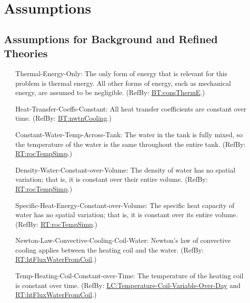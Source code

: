 \documentclass[12pt]{article}
\begin{document}

\section{Assumptions} \label{Sec:Assumps}

\subsection{Assumptions for Background and Refined Theories}

\begin{itemize}
\item[Thermal-Energy-Only:\phantomsection\label{assumpTEO}]{The only form of energy that is relevant for this problem is thermal energy. All other forms of energy, such as mechanical energy, are assumed to be negligible. (RefBy: \hyperref[BT:consThermE]{BT:consThermE}.)}
\item[Heat-Transfer-Coeffs-Constant:\phantomsection\label{assumpHTCC}]{All heat transfer coefficients are constant over time. (RefBy: \hyperref[BT:nwtnCooling]{BT:nwtnCooling}.)}
\item[Constant-Water-Temp-Across-Tank:\phantomsection\label{assumpCWTAT}]{The water in the tank is fully mixed, so the temperature of the water is the same throughout the entire tank. (RefBy: \hyperref[RT:rocTempSimp]{RT:rocTempSimp}.)}
\item[Density-Water-Constant-over-Volume:\phantomsection\label{assumpDWCoW}]{The density of water has no spatial variation; that is, it is constant over their entire volume. (RefBy: \hyperref[RT:rocTempSimp]{RT:rocTempSimp}.)}
\item[Specific-Heat-Energy-Constant-over-Volume:\phantomsection\label{assumpSHECoW}]{The specific heat capacity of water has no spatial variation; that is, it is constant over its entire volume. (RefBy: \hyperref[RT:rocTempSimp]{RT:rocTempSimp}.)}
\item[Newton-Law-Convective-Cooling-Coil-Water:\phantomsection\label{assumpLCCCW}]{Newton's law of convective cooling applies between the heating coil and the water. (RefBy: \hyperref[RT:htFluxWaterFromCoil]{RT:htFluxWaterFromCoil}.)}
\item[Temp-Heating-Coil-Constant-over-Time:\phantomsection\label{assumpTHCCoT}]{The temperature of the heating coil is constant over time. (RefBy: \hyperref[likeChgTCVOD]{LC:Temperature-Coil-Variable-Over-Day} and \hyperref[RT:htFluxWaterFromCoil]{RT:htFluxWaterFromCoil}.)}

\end{itemize}
\end{document}
